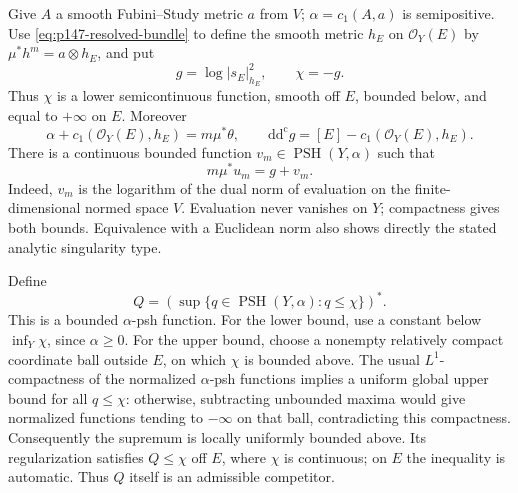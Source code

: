 Give \(A\) a smooth Fubini--Study metric \(a\) from \(V\);
\(\alpha=c_1(A,a)\) is semipositive.
Use \eqref{eq:p147-resolved-bundle} to define the smooth metric \(h_E\) on
\(\mathcal O_Y(E)\) by \(\mu^*h^m=a\otimes h_E\), and put
\[
 g=\log|s_E|_{h_E}^2,\qquad \chi=-g.
\]
Thus \(\chi\) is a lower semicontinuous function, smooth off \(E\),
bounded below, and equal to \(+\infty\) on \(E\).
Moreover
\[
 \alpha+c_1(\mathcal O_Y(E),h_E)=m\mu^*\theta,\qquad
 \mathrm d\mathrm d^{\mathrm c}g=[E]-c_1(\mathcal O_Y(E),h_E).
\]
There is a continuous bounded function \(v_m\in\operatorname{PSH}(Y,\alpha)\)
such that
\begin{equation}\label{eq:p147-fixed-singularity}
                       m\mu^*u_m=g+v_m.
\end{equation}
Indeed, \(v_m\) is the logarithm of the dual norm of evaluation on the
finite-dimensional normed space \(V\).  Evaluation never vanishes on
\(Y\); compactness gives both bounds.  Equivalence with a Euclidean norm
also shows directly the stated analytic singularity type.

Define
\begin{equation}\label{eq:p147-residual-envelope}
 Q=\left(\sup\{q\in\operatorname{PSH}(Y,\alpha):q\leq\chi\}\right)^*.
\end{equation}
This is a bounded \(\alpha\)-psh function.  For the lower bound, use a
constant below \(\inf_Y\chi\), since \(\alpha\geq0\).
For the upper bound, choose a nonempty relatively compact coordinate ball
outside \(E\), on which \(\chi\) is bounded above.
The usual \(L^1\)-compactness of the normalized \(\alpha\)-psh functions
implies a uniform global upper bound for all \(q\leq\chi\): otherwise,
subtracting unbounded maxima would give normalized functions tending to
\(-\infty\) on that ball, contradicting this compactness.
Consequently the supremum is locally uniformly bounded above.
Its regularization satisfies \(Q\leq\chi\) off \(E\), where \(\chi\) is
continuous; on \(E\) the inequality is automatic.  Thus \(Q\) itself is
an admissible competitor.


